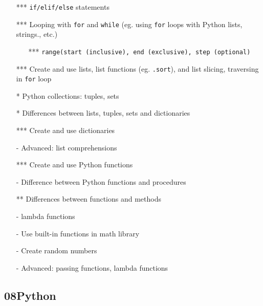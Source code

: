 \documentclass[12pt]{article}%
\begin{document}
\begin{itemize}
\item[***] {\tt if/elif/else} statements
\item[***] Looping with {\tt  for} and {\tt while} (eg. using {\tt for} loops with Python lists, strings., etc.)
\begin{itemize}
\item[***] {\tt range(start (inclusive), end (exclusive), step (optional)}
\end{itemize}
\item[***] Create and use lists, list functions (eg. {\tt .sort}), and list slicing, traversing in {\tt for} loop
\item[*] Python collections: tuples, sets
\item[*] Differences between lists, tuples, sets and dictionaries
\item[***] Create and use dictionaries
\item[-]  Advanced: list comprehensions
\item[***] Create and use Python functions
\item[-] Difference between Python functions and procedures
\item[**] Differences between functions and methods
\item[-] lambda functions
\item[-] Use built-in functions in math library
\item[-] Create random numbers
\item[-] Advanced: passing functions, lambda functions
\end{itemize}



\subsection*{08Python}
\end{document}
